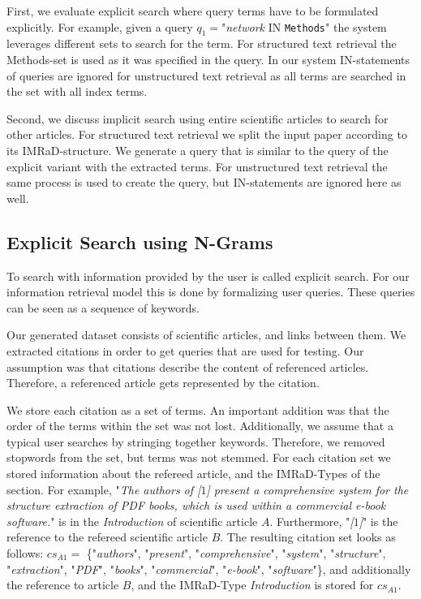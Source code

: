 First, we evaluate explicit search where query terms have to be formulated explicitly. For example, given a query $q_1=$"\textit{network} IN \texttt{Methods}" the system leverages different sets to search for the term. For structured text retrieval the Methods-set is used as it was specified in the query. In our system IN-statements of queries are ignored for unstructured text retrieval as all terms are searched in the set with all index terms.

Second, we discuss implicit search using entire scientific articles to search for other articles. For structured text retrieval we split the input paper according to its IMRaD-structure. We generate a query that is similar to the query of the explicit variant with the extracted terms. For unstructured text retrieval the same process is used to create the query, but IN-statements are ignored here as well.


\subsection{Explicit Search using N-Grams}

To search with information provided by the user is called explicit search. For our information retrieval model this is done by formalizing user queries. These queries can be seen as a sequence of keywords.

Our generated dataset consists of scientific articles, and links between them. We extracted citations in order to get queries that are used for testing. Our assumption was that citations describe the content of referenced articles. Therefore, a referenced article gets represented by the citation.

We store each citation as a set of terms. An important addition was that the order of the terms within the set was not lost. Additionally, we assume that a typical user searches by stringing together keywords. Therefore, we removed stopwords from the set, but terms was not stemmed. For each citation set we stored information about the refereed article, and the IMRaD-Types of the section. For example, "\textit{The authors of [$1$] present a comprehensive system for the structure extraction of PDF books, which is used within a commercial e-book software.}" is in the \textit{Introduction} of scientific article $A$. Furthermore, "\textit{[$1$]}" is the reference to the refereed scientific article $B$. The resulting citation set looks as follows: $cs_{A1} =$ \{"\textit{authors}", "\textit{present}", "\textit{comprehensive}", "\textit{system}", "\textit{structure}", "\textit{extraction}", "\textit{PDF}", "\textit{books}", "\textit{commercial}", "\textit{e-book}", "\textit{software}"\}, and additionally the reference to article $B$, and the IMRaD-Type \textit{Introduction} is stored for $cs_{A1}$.

